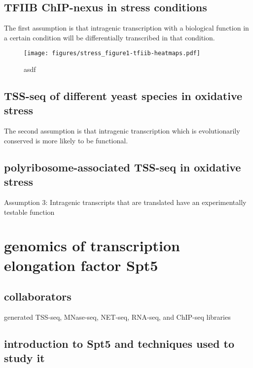 \documentclass[9pt, letterpaper]{article}
\begin{document}
\subsection{TFIIB ChIP-nexus in stress conditions}

The first assumption is that intragenic transcription with a biological function in a certain condition will be differentially transcribed in that condition.

\begin{figure}[H]
\centering
\texttt{[image: figures/stress\_figure1-tfiib-heatmaps.pdf]}
\caption{asdf}
\label{fig:stress_tfiib-heatmaps}
\end{figure}

\subsection{TSS-seq of different yeast species in oxidative stress}

The second assumption is that intragenic transcription which is evolutionarily conserved is more likely to be functional.

\subsection{polyribosome-associated TSS-seq in oxidative stress}

Assumption 3: Intragenic transcripts that are translated have an experimentally testable function

\section{genomics of transcription elongation factor Spt5}

\subsection{collaborators}

\begin{description}[align=right, labelwidth=5cm, noitemsep]
    \item [Ameet Shetty] generated TSS-seq, MNase-seq, NET-seq, RNA-seq, and ChIP-seq libraries
\end{description}

\subsection{introduction to Spt5 and techniques used to study it}
\end{document}
